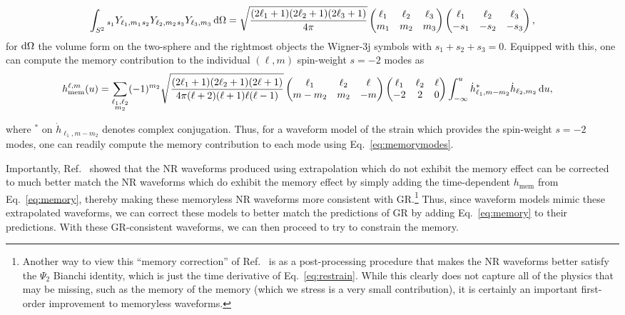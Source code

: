 \documentclass[aps,prd,reprint,twocolumn,10pt,eqsecnum,showpacs,nofootinbib,amsfonts,amssymb,amsmath,longbibliography,superscriptaddress,floatfix]{revtex4-1}
\begin{document}
\begin{widetext}
\begin{align}
	\int_{S^{2}}\phantom{}_{s_{1}}Y_{\ell_{1},m_{1}}\phantom{}_{s_{2}}Y_{\ell_{2},m_{2}}\phantom{}_{s_{3}}Y_{\ell_{3},m_{3}}\,{\rm d}\Omega=\sqrt{\dfrac{(2\ell_{1}+1)(2\ell_{2}+1)(2\ell_{3}+1)}{4\pi}}\begin{pmatrix}\ell_{1}&\ell_{2}&\ell_{3}\\m_{1}&m_{2}&m_{3}\end{pmatrix}\begin{pmatrix}\ell_{1}&\ell_{2}&\ell_{3}\\-s_{1}&-s_{2}&-s_{3}\end{pmatrix},
\end{align}
for ${\rm d}\Omega$ the volume form on the two-sphere and the rightmost objects the Wigner-3j symbols with $s_{1}+s_{2}+s_{3}=0$. Equipped with this, one can compute the memory contribution to the individual $(\ell,m)$ spin-weight $s =-2$ modes as
\begin{align}
	\label{eq:memorymodes}
	h_{\mathrm{mem}}^{\ell,m}(u)&=\sum\limits_{\substack{\ell_{1},\ell_{2}\\m_{2}}}(-1)^{m_{2}}\sqrt{\dfrac{(2\ell_{1}+1)(2\ell_{2}+1)(2\ell+1)}{4\pi(\ell+2)(\ell+1)\ell(\ell-1)}}\begin{pmatrix}\ell_{1}&\ell_{2}&\ell\\m-m_{2}&m_{2}&-m\end{pmatrix}\begin{pmatrix}\ell_{1}&\ell_{2}&\ell\\-2&2&0\end{pmatrix}\int_{-\infty}^{u}\dot{h}^{*}_{\ell_{1},m-m_{2}}\dot{h}_{\ell_{2},m_{2}}\,{\rm d}u,
\end{align}
\end{widetext}
where $\phantom{}^{*}$ on $\dot{h}_{\ell_{1}, m-m_{2}}$ denotes complex conjugation. Thus, for a waveform model of the strain which provides the spin-weight $s =-2$ modes, one can readily compute the memory contribution to each mode using Eq.~\eqref{eq:memorymodes}.

Importantly, Ref.~\cite{Mitman:2020bjf} showed that the NR waveforms produced using extrapolation which do not exhibit the memory effect can be corrected to much better match the NR waveforms which do exhibit the memory effect by simply adding the time-dependent $h_{\mathrm{mem}}$ from Eq.~\eqref{eq:memory}, thereby making these memoryless NR waveforms more consistent with GR.\footnote{Another way to view this ``memory correction'' of Ref.~\cite{Mitman:2020bjf} is as a post-processing procedure that makes the NR waveforms better satisfy the $\Psi_{2}$ Bianchi identity, which is just the time derivative of Eq.~\eqref{eq:restrain}. While this clearly does not capture all of the physics that may be missing, such as the memory of the memory (which we stress is a very small contribution), it is certainly an important first-order improvement to memoryless waveforms.} Thus, since waveform models mimic these extrapolated waveforms, we can correct these models to better match the predictions of GR by adding Eq.~\eqref{eq:memory} to their predictions. With these GR-consistent waveforms, we can then proceed to try to constrain the memory.
\end{document}
